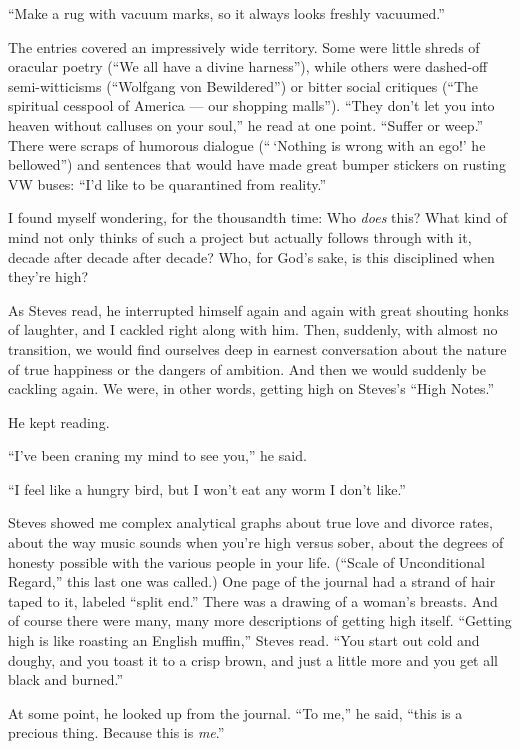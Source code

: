 ``Make a rug with vacuum marks, so it always looks freshly vacuumed.''

The entries covered an impressively wide territory. Some were little
shreds of oracular poetry (``We all have a divine harness''), while
others were dashed-off semi-witticisms (``Wolfgang von Bewildered'') or
bitter social critiques (``The spiritual cesspool of America --- our
shopping malls''). ``They don't let you into heaven without calluses on
your soul,'' he read at one point. ``Suffer or weep.'' There were scraps
of humorous dialogue (`` `Nothing is wrong with an ego!' he bellowed'')
and sentences that would have made great bumper stickers on rusting VW
buses: ``I'd like to be quarantined from reality.''

I found myself wondering, for the thousandth time: Who \emph{does} this?
What kind of mind not only thinks of such a project but actually follows
through with it, decade after decade after decade? Who, for God's sake,
is this disciplined when they're high?

As Steves read, he interrupted himself again and again with great
shouting honks of laughter, and I cackled right along with him. Then,
suddenly, with almost no transition, we would find ourselves deep in
earnest conversation about the nature of true happiness or the dangers
of ambition. And then we would suddenly be cackling again. We were, in
other words, getting high on Steves's ``High Notes.''

He kept reading.

``I've been craning my mind to see you,'' he said.

``I feel like a hungry bird, but I won't eat any worm I don't like.''

Steves showed me complex analytical graphs about true love and divorce
rates, about the way music sounds when you're high versus sober, about
the degrees of honesty possible with the various people in your life.
(``Scale of Unconditional Regard,'' this last one was called.) One page
of the journal had a strand of hair taped to it, labeled ``split end.''
There was a drawing of a woman's breasts. And of course there were many,
many more descriptions of getting high itself. ``Getting high is like
roasting an English muffin,'' Steves read. ``You start out cold and
doughy, and you toast it to a crisp brown, and just a little more and
you get all black and burned.''

At some point, he looked up from the journal. ``To me,'' he said, ``this
is a precious thing. Because this is \emph{me}.''

